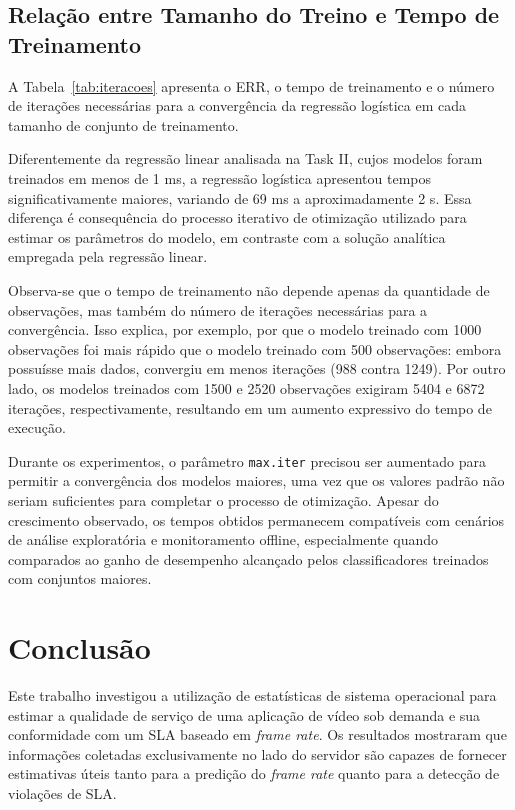 \documentclass[11pt,a4paper]{article}
\begin{document}
\subsection{Relação entre Tamanho do Treino e Tempo de Treinamento} 

A Tabela~\ref{tab:iteracoes} apresenta o ERR, o tempo de treinamento e o número de iterações necessárias para a convergência da regressão logística em cada tamanho de conjunto de treinamento.

Diferentemente da regressão linear analisada na Task II, cujos modelos foram treinados em menos de 1 ms, a regressão logística apresentou tempos significativamente maiores, variando de 69 ms a aproximadamente 2 s. Essa diferença é consequência do processo iterativo de otimização utilizado para estimar os parâmetros do modelo, em contraste com a solução analítica empregada pela regressão linear.

Observa-se que o tempo de treinamento não depende apenas da quantidade de observações, mas também do número de iterações necessárias para a convergência. Isso explica, por exemplo, por que o modelo treinado com 1000 observações foi mais rápido que o modelo treinado com 500 observações: embora possuísse mais dados, convergiu em menos iterações (988 contra 1249). Por outro lado, os modelos treinados com 1500 e 2520 observações exigiram 5404 e 6872 iterações, respectivamente, resultando em um aumento expressivo do tempo de execução.

Durante os experimentos, o parâmetro \texttt{max.iter} precisou ser aumentado para permitir a convergência dos modelos maiores, uma vez que os valores padrão não seriam suficientes para completar o processo de otimização. Apesar do crescimento observado, os tempos obtidos permanecem compatíveis com cenários de análise exploratória e monitoramento offline, especialmente quando comparados ao ganho de desempenho alcançado pelos classificadores treinados com conjuntos maiores.


\section{Conclusão}
\label{sec:conclusao}

Este trabalho investigou a utilização de estatísticas de sistema operacional para estimar a qualidade de serviço de uma aplicação de vídeo sob demanda e sua conformidade com um SLA baseado em \emph{frame rate}. Os resultados mostraram que informações coletadas exclusivamente no lado do servidor são capazes de fornecer estimativas úteis tanto para a predição do \emph{frame rate} quanto para a detecção de violações de SLA.
\end{document}

